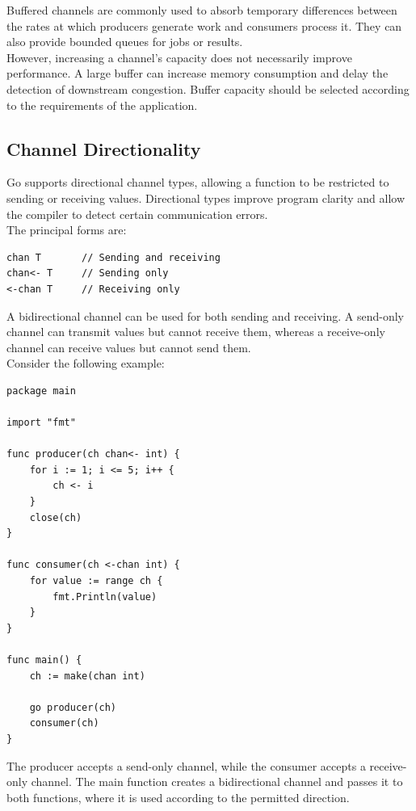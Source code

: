 Buffered channels are commonly used to absorb temporary differences between the rates at which producers generate work and consumers process it. They can also provide bounded queues for jobs or results.\\

However, increasing a channel's capacity does not necessarily improve performance. A large buffer can increase memory consumption and delay the detection of downstream congestion. Buffer capacity should be selected according to the requirements of the application.

\subsection{Channel Directionality}

Go supports directional channel types, allowing a function to be restricted to sending or receiving values. Directional types improve program clarity and allow the compiler to detect certain communication errors.\\

The principal forms are:

\begin{lstlisting}
chan T       // Sending and receiving
chan<- T     // Sending only
<-chan T     // Receiving only
\end{lstlisting}

A bidirectional channel can be used for both sending and receiving. A send-only channel can transmit values but cannot receive them, whereas a receive-only channel can receive values but cannot send them.\\

Consider the following example:

\begin{lstlisting}
package main

import "fmt"

func producer(ch chan<- int) {
    for i := 1; i <= 5; i++ {
        ch <- i
    }
    close(ch)
}

func consumer(ch <-chan int) {
    for value := range ch {
        fmt.Println(value)
    }
}

func main() {
    ch := make(chan int)

    go producer(ch)
    consumer(ch)
}
\end{lstlisting}

The producer accepts a send-only channel, while the consumer accepts a receive-only channel. The main function creates a bidirectional channel and passes it to both functions, where it is used according to the permitted direction.\\

